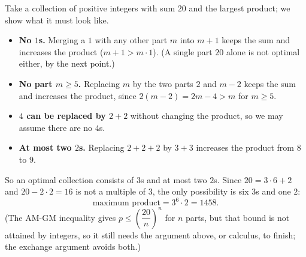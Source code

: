 Take a collection of positive integers with sum $20$ and the largest product; we show what it must look like.
\begin{itemize}
\item \textbf{No $1$s.} Merging a $1$ with any other part $m$ into $m+1$ keeps the sum and increases the product ($m+1>m\cdot1$). (A single part $20$ alone is not optimal either, by the next point.)
\item \textbf{No part $m\ge5$.} Replacing $m$ by the two parts $2$ and $m-2$ keeps the sum and increases the product, since $2(m-2)=2m-4>m$ for $m\ge5$.
\item \textbf{$4$ can be replaced by $2+2$} without changing the product, so we may assume there are no $4$s.
\item \textbf{At most two $2$s.} Replacing $2+2+2$ by $3+3$ increases the product from $8$ to $9$.
\end{itemize}
So an optimal collection consists of $3$s and at most two $2$s. Since $20=3\cdot6+2$ and $20-2\cdot2=16$ is not a multiple of $3$, the only possibility is six $3$s and one $2$:
\[
\text{maximum product}=3^6\cdot2=\boxed{1458}.
\]
(The AM-GM inequality gives $p\le\left(\dfrac{20}{n}\right)^n$ for $n$ parts, but that bound is not attained by integers, so it still needs the argument above, or calculus, to finish; the exchange argument avoids both.)
